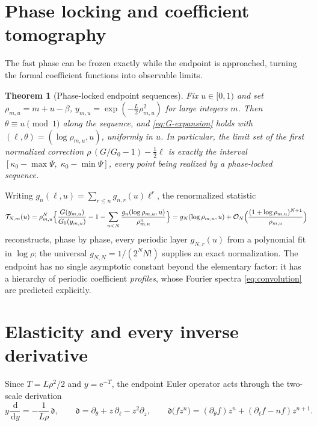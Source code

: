 \documentclass[11pt,oneside]{article}
\numberwithin{equation}{section}
\newtheorem{theorem}{Theorem}[section]
\theoremstyle{definition}
\theoremstyle{remark}
\newcommand{\dd}{\,\mathrm d}
\newcommand{\e}{\mathrm e}
\newcommand{\bigO}{\mathcal O}
\newcommand{\Gzero}{G_0}
\begin{document}
\section{Phase locking and coefficient tomography}
\label{sec:tomography}

The fast phase can be frozen exactly while the endpoint is
approached, turning the formal coefficient functions into observable
limits.

\begin{theorem}[Phase-locked endpoint sequences]
\label{thm:phase-locked}
Fix $u\in[0,1)$ and set
$\rho_{m,u}=m+u-\beta$,
$y_{m,u}=\exp(-\tfrac L2\rho_{m,u}^{2})$ for large integers $m$.
Then $\theta\equiv u\pmod1$ along the sequence, and
\eqref{eq:G-expansion} holds with
$(\ell,\theta)=(\log\rho_{m,u},u)$, uniformly in $u$.  In
particular, the limit set of the first normalized correction
$\rho\,(G/\Gzero-1)-\tfrac12\ell$ is exactly the interval
$[\kappa_0-\max\Psi,\;\kappa_0-\min\Psi]$, every point being realized
by a phase-locked sequence.
\end{theorem}

Writing $g_n(\ell,u)=\sum_{r\le n}g_{n,r}(u)\ell^{r}$, the
renormalized statistic
\begin{equation}
 \mathcal T_{N,m}(u)
 =\rho_{m,u}^{N}\Bigl\{
 \frac{G(y_{m,u})}{\Gzero(y_{m,u})}-1
 -\sum_{n<N}\frac{g_n(\log\rho_{m,u},u)}{\rho_{m,u}^{n}}
 \Bigr\}
 =g_N(\log\rho_{m,u},u)
 +\bigO_N\Bigl(\frac{(1+\log\rho_{m,u})^{N+1}}{\rho_{m,u}}\Bigr)
 \label{eq:tomography}
\end{equation}
reconstructs, phase by phase, every periodic layer
$g_{N,r}(u)$ from a polynomial fit in $\log\rho$; the universal
$g_{N,N}=1/(2^{N}N!)$ supplies an exact normalization.  The endpoint
has no single asymptotic constant beyond the elementary factor: it
has a hierarchy of periodic coefficient \emph{profiles}, whose
Fourier spectra \eqref{eq:convolution} are predicted explicitly.

\section{Elasticity and every inverse derivative}
\label{sec:derivatives}

Since $T=L\rho^{2}/2$ and $y=\e^{-T}$, the endpoint Euler operator
acts through the two-scale derivation
\begin{equation}
 y\frac{\dd}{\dd y}=-\frac1{L\rho}\,\mathfrak d,
 \qquad
 \mathfrak d=\partial_\theta+z\,\partial_\ell-z^{2}\partial_z,
 \qquad
 \mathfrak d\bigl(fz^{n}\bigr)
 =(\partial_\theta f)z^{n}
 +(\partial_\ell f-nf)z^{n+1}.
 \label{eq:two-scale-D}
\end{equation}
\end{document}
